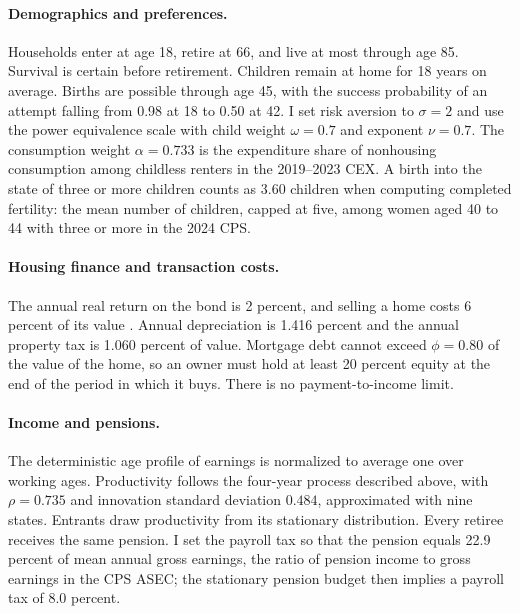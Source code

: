 \paragraph{Demographics and preferences.}
Households enter at age 18, retire at 66, and live at most through age 85.
Survival is certain before retirement. Children remain at home for 18 years
on average. Births are possible through age 45, with the success probability
of an attempt falling from 0.98 at 18 to 0.50 at 42. I set risk aversion to
$\sigma=2$ and use the power equivalence scale with child weight $\omega=0.7$
and exponent $\nu=0.7$. The consumption weight $\alpha=0.733$ is the
expenditure share of nonhousing consumption among childless renters in the
2019--2023 CEX. A birth into the state of three or more children counts as
3.60 children when computing completed fertility: the mean number of
children, capped at five, among women aged 40 to 44 with three or more in the
2024 CPS.

\paragraph{Housing finance and transaction costs.}
The annual real return on the bond is 2 percent, and selling a home costs 6
percent of its value \citep{greaneyDynamicUrbanEconomics2025}. Annual
depreciation is 1.416 percent and the annual property tax is 1.060 percent of
value. Mortgage debt cannot exceed $\phi=0.80$ of the value of the home, so an
owner must hold at least 20 percent equity at the end of the period in which
it buys. There is no payment-to-income limit.

\paragraph{Income and pensions.}
The deterministic age profile of earnings is normalized to average one over
working ages. Productivity follows the four-year process described above, with
$\rho=0.735$ and innovation standard deviation $0.484$, approximated with nine
states. Entrants draw productivity from its stationary distribution. Every
retiree receives the same pension. I set the payroll tax so that the pension
equals 22.9 percent of mean annual gross earnings, the ratio of pension
income to gross earnings in the CPS ASEC; the stationary pension budget then
implies a payroll tax of 8.0 percent.

